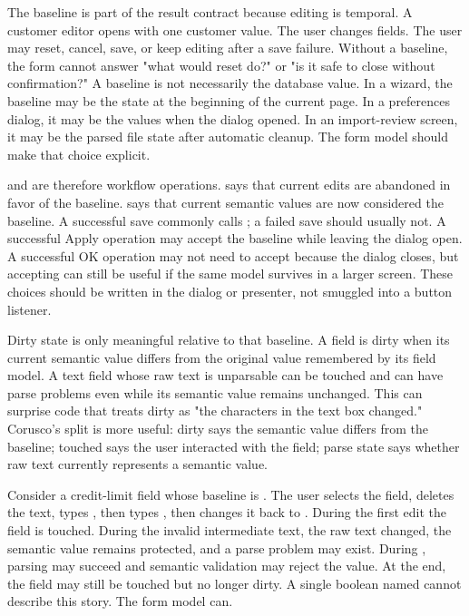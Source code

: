 The baseline is part of the result contract because editing is temporal. A
customer editor opens with one customer value. The user changes fields. The
user may reset, cancel, save, or keep editing after a save failure. Without a
baseline, the form cannot answer "what would reset do?" or "is it safe to close
without confirmation?" A baseline is not necessarily the database value. In a
wizard, the baseline may be the state at the beginning of the current page. In
a preferences dialog, it may be the values when the dialog opened. In an
import-review screen, it may be the parsed file state after automatic cleanup.
The form model should make that choice explicit.

 and  are therefore workflow operations.
 says that current edits are abandoned in favor of the baseline.
 says that current semantic values are now considered
the baseline. A successful save commonly calls ; a
failed save should usually not. A successful Apply operation may accept the
baseline while leaving the dialog open. A successful OK operation may not need
to accept because the dialog closes, but accepting can still be useful if the
same model survives in a larger screen. These choices should be written in the
dialog or presenter, not smuggled into a button listener.

Dirty state is only meaningful relative to that baseline. A field is dirty when
its current semantic value differs from the original value remembered by its
field model. A text field whose raw text is unparsable can be touched and can
have parse problems even while its semantic value remains unchanged. This can
surprise code that treats dirty as "the characters in the text box changed."
Corusco's split is more useful: dirty says the semantic value differs from the
baseline; touched says the user interacted with the field; parse state says
whether raw text currently represents a semantic value.

Consider a credit-limit field whose baseline is . The user selects
the field, deletes the text, types \api{-}, then types , then changes
it back to . During the first edit the field is touched. During the
invalid intermediate text, the raw text changed, the semantic value remains
protected, and a parse problem may exist. During , parsing may succeed
and semantic validation may reject the value. At the end, the field may still
be touched but no longer dirty. A single boolean named  cannot
describe this story. The form model can.

